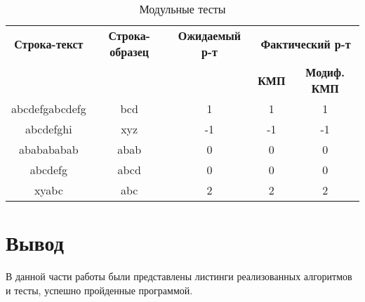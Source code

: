 \begin{table}[ht]
	\small
	\begin{center}
		\begin{threeparttable}
			\caption{Модульные тесты}
			\label{t:mod_tests}
			\begin{tabular}{|c|c|c|c|c|}
				\hline
				\bfseries Строка-текст
				& \bfseries Строка-образец
				& \bfseries Ожидаемый р-т
				& \multicolumn{2}{c|}{\bfseries Фактический р-т} \\ \cline{4-5}
				& & & \bfseries КМП & \bfseries Модиф. КМП \\
				\hline
				abcdefgabcdefg & bcd & 1 & 1 & 1 \\
				\hline
				abcdefghi & xyz & -1 & -1 & -1 \\
				\hline
				ababababab & abab & 0  & 0 & 0 \\
				\hline
				abcdefg & abcd & 0 & 0 & 0 \\
				\hline
				xyabc & abc & 2 & 2 & 2 \\
				\hline
			\end{tabular}	
		\end{threeparttable}	
	\end{center}
\end{table}

\section*{Вывод}
В данной части работы были представлены листинги реализованных алгоритмов и тесты, успешно пройденные программой.